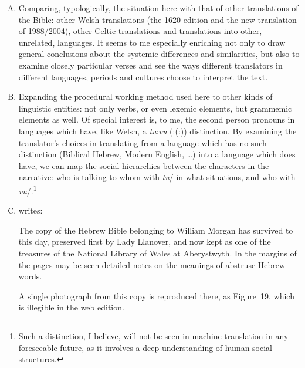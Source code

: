 \begin{enumerate}[A.]
	\item Comparing, typologically, the situation here with that of other translations of the Bible: other Welsh translations (the 1620 edition and the new translation of 1988/2004), other Celtic translations and translations into other, unrelated, languages. It seems to me especially enriching not only to draw general conclusions about the systemic differences and similarities, but also to examine closely particular verses and see the ways different translators in different languages, periods and cultures choose to interpret the text.


	\item Expanding the procedural working method used here to other kinds of linguistic entities: not only verbs, or even lexemic elements, but grammemic elements as well. Of special interest is, to me, the second person pronouns in languages which have, like Welsh, a \mbox{\textit{tu}:\textit{vu}} (\mbox{:(:)}) distinction. By examining the translator’s choices in translating from a language which has no such distinction (Biblical Hebrew, Modern English, …) into a language which does have, we can map the social hierarchies between the characters in the narrative: who is talking to whom with \textit{tu}/ in what situations, and who with \textit{vu}/.\footnote{Such a distinction, I believe, will not be seen in machine translation in any foreseeable future, as it involves a deep understanding of {human} social structures.}


	\item \cite{morgan.p:1988:beibl} writes:
		\begin{changemargin}{1cm}{0cm}
			\begin{bilingquote}
				\transline
				{}
				{The copy of the Hebrew Bible belonging to William Morgan has survived to this day, preserved first by Lady Llanover, and now kept as one of the treasures of the National Library of Wales at Aberystwyth. In the margins of the pages may be seen detailed notes on the meanings of abstruse Hebrew words.}
			\end{bilingquote}
		\end{changemargin}
		\vspace{-0.5cm}
		A single photograph from this copy is reproduced there, as Figure~19, which is illegible in the web edition.


\end{enumerate}
